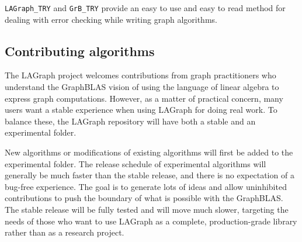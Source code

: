 \verb'LAGraph_TRY' and \verb'GrB_TRY' provide an easy to use and easy to read method for dealing with
error checking while writing graph algorithms.


\subsection{Contributing algorithms}

The LAGraph project welcomes contributions from graph practitioners who understand the GraphBLAS vision
of using the language of linear algebra to express graph computations. However, as a matter of
practical concern, many users want a stable experience when using LAGraph for doing real work. To balance
these, the LAGraph repository will have both a stable and an experimental folder.

New algorithms or modifications of existing algorithms will first be added to the experimental folder.
The release schedule of experimental algorithms will generally be much faster than the stable release,
and there is no expectation of a bug-free experience.
The goal is to generate lots of ideas and allow uninhibited contributions to
push the boundary of what is possible with the GraphBLAS. The stable release will be fully tested and
will move much slower, targeting the needs of those who want to use LAGraph as a complete, production-grade
library rather than as a research project.
